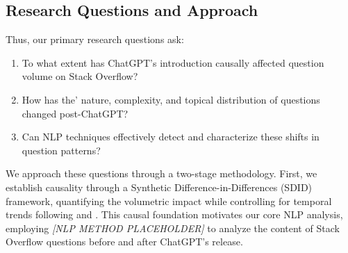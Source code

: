 


\subsection{Research Questions and Approach}
Thus, our primary research questions ask: 
\begin{enumerate}
    \item To what extent has ChatGPT's introduction causally affected question volume on Stack Overflow?
    \item How has the' nature, complexity, and topical distribution of questions changed post-ChatGPT?
    \item Can NLP techniques effectively detect and characterize these shifts in question patterns?
\end{enumerate}

We approach these questions through a two-stage methodology. First, we establish causality through a Synthetic Difference-in-Differences (SDID) framework, quantifying the volumetric impact while controlling for temporal trends following \textcite{arkhangelsky_synthetic_2021} and \textcite{clarke_synthetic_2023}. This causal foundation motivates our core NLP analysis, employing \textit{[NLP METHOD PLACEHOLDER]} to analyze the content of Stack Overflow questions before and after ChatGPT's release.